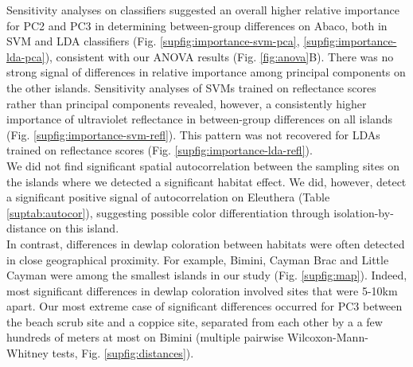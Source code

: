 Sensitivity analyses on classifiers suggested an overall higher relative importance for PC2 and PC3 in determining between-group differences on Abaco, both in SVM and LDA classifiers (Fig. \ref{supfig:importance-svm-pca}, \ref{supfig:importance-lda-pca}), consistent with our ANOVA results (Fig. \ref{fig:anova}B). There was no strong signal of differences in relative importance among principal components on the other islands. Sensitivity analyses of SVMs trained on reflectance scores rather than principal components revealed, however, a consistently higher importance of ultraviolet reflectance in between-group differences on all islands (Fig. \ref{supfig:importance-svm-refl}). This pattern was not recovered for LDAs trained on reflectance scores (Fig. \ref{supfig:importance-lda-refl}).\\


We did not find significant spatial autocorrelation between the sampling sites on the islands where we detected a significant habitat effect. We did, however, detect a significant positive signal of autocorrelation on Eleuthera (Table \ref{suptab:autocor}), suggesting possible color differentiation through isolation-by-distance on this island.\\

In contrast, differences in dewlap coloration between habitats were often detected in close geographical proximity. For example, Bimini, Cayman Brac and Little Cayman were among the smallest islands in our study (Fig. \ref{supfig:map}). Indeed, most significant differences in dewlap coloration involved sites that were 5-10km apart. Our most extreme case of significant differences occurred for PC3 between the beach scrub site and a coppice site, separated from each other by a a few hundreds of meters at most on Bimini (multiple pairwise Wilcoxon-Mann-Whitney tests, Fig. \ref{supfig:distances}).\\


